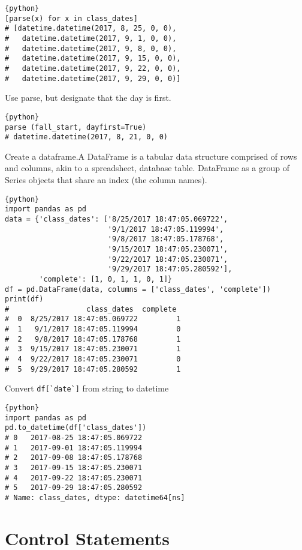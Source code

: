 \begin{lstlisting}{python}
[parse(x) for x in class_dates] 
# [datetime.datetime(2017, 8, 25, 0, 0),
#   datetime.datetime(2017, 9, 1, 0, 0),
#   datetime.datetime(2017, 9, 8, 0, 0),
#   datetime.datetime(2017, 9, 15, 0, 0),
#   datetime.datetime(2017, 9, 22, 0, 0),
#   datetime.datetime(2017, 9, 29, 0, 0)]  
\end{lstlisting}

Use parse, but designate that the day is first.

\begin{lstlisting}{python}
parse (fall_start, dayfirst=True)
# datetime.datetime(2017, 8, 21, 0, 0)
\end{lstlisting}

Create a dataframe.A DataFrame is a tabular data structure comprised of
rows and columns, akin to a spreadsheet, database table. DataFrame as a
group of Series objects that share an index (the column names).

\begin{lstlisting}{python}
import pandas as pd
data = {'class_dates': ['8/25/2017 18:47:05.069722', 
                        '9/1/2017 18:47:05.119994', 
                        '9/8/2017 18:47:05.178768', 
                        '9/15/2017 18:47:05.230071', 
                        '9/22/2017 18:47:05.230071', 
                        '9/29/2017 18:47:05.280592'], 
        'complete': [1, 0, 1, 1, 0, 1]} 
df = pd.DataFrame(data, columns = ['class_dates', 'complete'])
print(df)
#                  class_dates  complete
#  0  8/25/2017 18:47:05.069722         1
#  1   9/1/2017 18:47:05.119994         0
#  2   9/8/2017 18:47:05.178768         1
#  3  9/15/2017 18:47:05.230071         1
#  4  9/22/2017 18:47:05.230071         0
#  5  9/29/2017 18:47:05.280592         1
\end{lstlisting}

Convert \verb|df[`date`]| from string to datetime

\begin{lstlisting}{python}
import pandas as pd
pd.to_datetime(df['class_dates'])
# 0   2017-08-25 18:47:05.069722
# 1   2017-09-01 18:47:05.119994
# 2   2017-09-08 18:47:05.178768
# 3   2017-09-15 18:47:05.230071
# 4   2017-09-22 18:47:05.230071
# 5   2017-09-29 18:47:05.280592
# Name: class_dates, dtype: datetime64[ns]
\end{lstlisting}

\section{Control Statements}\label{control-statements}

